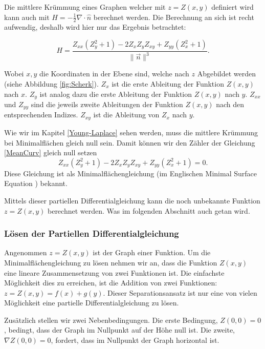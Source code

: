 \begin{refsection}
Die mittlere Krümmung eines Graphen welcher mit $z=Z(x,y)$ definiert wird kann auch mit $H=-\frac{1}{2} \nabla \cdot \hat{n}$\cite{minimal:Spivak} berechnet werden. Die Berechnung an sich ist recht aufwendig, deshalb wird hier nur das Ergebnis betrachtet:

\begin{equation}\label{MeanCurv}
H=\frac{Z_{xx}(Z_y^2+1) - 2 Z_xZ_yZ_{xy}+Z_{yy}(Z_x^2+1)}{\|\vec{n}\|^3}.
\end{equation}

Wobei ${x,y}$ die Koordinaten in der Ebene sind, welche nach $z$ Abgebildet werden (siehe Abbildung \ref{fig:Scherk}). $Z_x$ ist die erste Ableitung der Funktion $Z(x,y)$ nach $x$. $Z_y$ ist analog dazu die erste Ableitung der Funktion $Z(x,y)$ nach $y$. $Z_{xx}$ und $Z_{yy}$ sind die jeweils zweite Ableitungen der Funktion $Z(x,y)$ nach den entsprechenden Indizes. $Z_{xy}$ ist die Ableitung von $Z_x$ nach $y$.

Wie wir im Kapitel \ref{Young-Laplace} sehen werden, muss die mittlere Krümmung bei Minimalflächen gleich null sein. Damit können wir den Zähler der Gleichung \eqref{MeanCurv} gleich null setzen
\begin{equation}\label{MFG}
Z_{xx}(Z_y^2+1) - 2 Z_xZ_yZ_{xy}+Z_{yy}(Z_x^2+1)=0.
\end{equation}
Diese Gleichung ist als Minimalflächengleichung (im Englischen Minimal Surface Equation \cite{minimal:Osserman}) bekannt.

Mittels dieser partiellen Differentialgleichung kann die noch unbekannte Funktion $z=Z(x,y)$ berechnet werden. Was im folgenden Abschnitt auch getan wird.


\subsubsection{Lösen der Partiellen Differentialgleichung}\label{Scherk Berechnung}
Angenommen $z=Z(x,y)$ ist der Graph einer Funktion. Um die Minimalflächengleichung zu lösen nehmen wir an, dass die Funktion $Z(x,y)$ eine lineare Zusammensetzung von zwei Funktionen ist. Die einfachste Möglichkeit dies zu erreichen, ist die Addition von zwei Funktionen: $z=Z(x,y)=f(x)+g(y)$. Dieser Separationsansatz ist nur eine von vielen Möglichkeit eine partielle Differentialgleichung zu lösen.

Zusätzlich stellen wir zwei Nebenbedingungen. Die erste Bedingung, $Z(0,0)=0$, bedingt, dass der Graph im Nullpunkt auf der Höhe null ist. Die zweite, $\nabla Z(0,0)=0$, fordert, dass im Nullpunkt der Graph horizontal ist.


\end{refsection}
